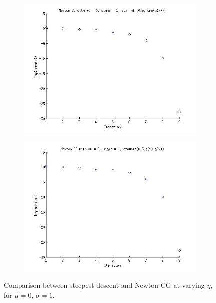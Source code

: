 \documentclass{article}
\begin{document}
\begin{figure}[!htb]
\begin{subfigure}[bh]{0.45\textwidth}
        \end{subfigure}
        \centering
        \begin{subfigure}[bh]{0.45\textwidth}
                \includegraphics[width=\textwidth]{figs/P3NCGmu0sig1eta2.jpg}
        \end{subfigure}%
        \begin{subfigure}[bh]{0.45\textwidth}
                \includegraphics[width=\textwidth]{figs/P3NCGmu0sig1eta3.jpg}
        \end{subfigure}
        \caption{Comparison between steepest descent and Newton CG at
 varying $\eta$, for $\mu=0$, $\sigma=1$.}
\end{figure}
\end{document}
